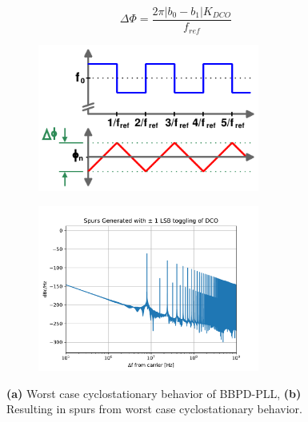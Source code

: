 		\begin{equation}\label{eq:cyclo_dph}
			\Delta \Phi = \frac{2\pi|b_0-b_1|K_{DCO}}{f_{ref}}
		\end{equation}

	\begin{figure}[htb!]
	    \centering
	    \begin{subfigure}{0.5\textwidth}
	        \centering
	        \includegraphics[width=0.8\textwidth, angle=0]{./figs/bbpd_resolution_phase_walk}
	        \caption{ }
	        \label{fig:cylostationary}
	    \end{subfigure}%
	    \begin{subfigure}{0.5\textwidth}
	        \centering
	        \center\includegraphics[width=0.8\textwidth, angle=0]{./figs/spurs_dco}
	        \caption{ }
	        \label{fig:cylostationary_spurs}
	    \end{subfigure}
	    \caption{\textbf{(a)} Worst case cyclostationary behavior of BBPD-PLL, \textbf{(b)} Resulting in spurs from worst case cyclostationary behavior.}
	    \label{fig:cyclostationary_nonsense}
	\end{figure}


